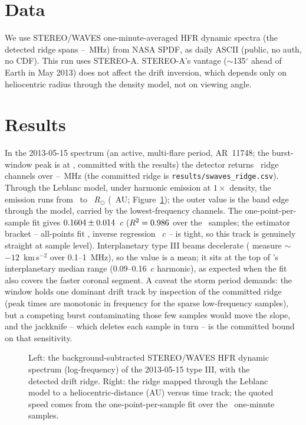 \documentclass[twocolumn]{aastex631}
\newcommand{\code}[1]{\texttt{#1}}
\begin{document}
\section{Data}
We use STEREO/WAVES one-minute-averaged HFR dynamic spectra (the detected ridge spans \swRealFlo--\swRealFhi~MHz) from NASA SPDF, as daily
ASCII (public, no auth, no CDF). This run uses STEREO-A. STEREO-A's vantage ($\sim$135$^\circ$ ahead of
Earth in May 2013) does not affect the drift inversion, which depends only on heliocentric radius
through the density model, not on viewing angle.

\section{Results}
In the 2013-05-15 spectrum (an active, multi-flare period, AR~11748; the burst-window peak is at
\swRealPeakUTC, committed with the results) the detector returns \swRealNridge\ ridge channels
over \swRealFlo--\swRealFhi~MHz (the committed ridge is \code{results/swaves\_ridge.csv}).
Through the Leblanc model, under harmonic emission at $1\times$ density, the emission runs from
\swRealRlo\ to \swRealRhi~$R_\odot$ (\swRealRhiAU~AU; Figure~\ref{fig:swaves}); the outer value
is the band edge through the model, carried by the lowest-frequency channels. The one-point-per-
sample fit gives $0.1604\pm0.014$~$c$ ($R^2=0.986$ over the
\swRealNtimeCols\ samples; the estimator bracket -- all-points fit \swRealSpeedCPoints, inverse
regression \swRealSpeedCInverse~$c$ -- is tight, so this track is genuinely straight at sample
level). Interplanetary type III beams decelerate (\citealt{krupar2015} measure
$\sim$$-12$~km\,s$^{-2}$ over 0.1--1~MHz), so the value is a mean; it sits at the top of
\citet{krupar2015}'s interplanetary median range (0.09--0.16~$c$ harmonic), as expected when the
fit also covers the faster coronal segment. A caveat the storm period demands: the window holds
one dominant drift track by inspection of the committed ridge (peak times are monotonic in
frequency for the sparse low-frequency samples), but a competing burst contaminating those few
samples would move the slope, and the jackknife -- which deletes each sample in turn -- is the
committed bound on that sensitivity.

\begin{figure}
\caption{Left: the background-subtracted STEREO/WAVES HFR dynamic spectrum (log-frequency) of the
2013-05-15 type III, with the detected drift ridge. Right: the ridge mapped through the Leblanc
model to a heliocentric-distance (AU) versus time track; the quoted speed comes from the
one-point-per-sample fit over the \swRealNtimeCols\ one-minute samples.}
\label{fig:swaves}
\end{figure}
\end{document}
